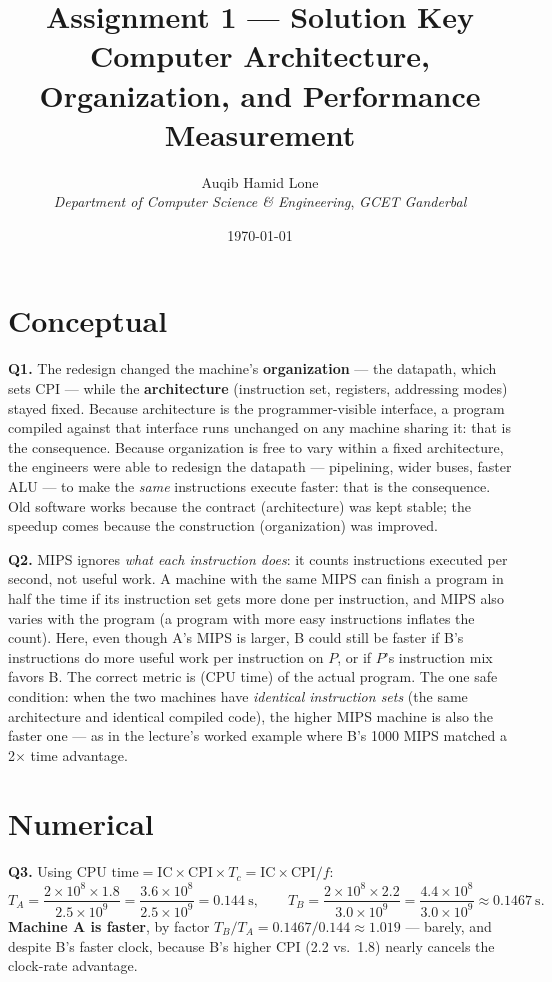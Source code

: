 \documentclass[11pt]{article}
\title{Assignment 1 --- Solution Key\\\large Computer Architecture, Organization, and Performance Measurement}
\author{Auqib Hamid Lone\\[0.3em]
  \emph{Department of Computer Science \& Engineering}, \emph{GCET Ganderbal}}
\date{\today}
\begin{document}
\maketitle

\section{Conceptual}

\textbf{Q1.} The redesign changed the machine's \textbf{organization} --- the datapath, which sets CPI --- while the \textbf{architecture} (instruction set, registers, addressing modes) stayed fixed. Because architecture is the programmer-visible interface, a program compiled against that interface runs unchanged on any machine sharing it: that is the  consequence. Because organization is free to vary within a fixed architecture, the engineers were able to redesign the datapath --- pipelining, wider buses, faster ALU --- to make the \emph{same} instructions execute faster: that is the  consequence. Old software works because the contract (architecture) was kept stable; the speedup comes because the construction (organization) was improved.

\textbf{Q2.} MIPS ignores \emph{what each instruction does}: it counts instructions executed per second, not useful work. A machine with the same MIPS can finish a program in half the time if its instruction set gets more done per instruction, and MIPS also varies with the program (a program with more easy instructions inflates the count). Here, even though A's MIPS is larger, B could still be faster if B's instructions do more useful work per instruction on $P$, or if $P$'s instruction mix favors B. The correct metric is  (CPU time) of the actual program. The one safe condition: when the two machines have \emph{identical instruction sets} (the same architecture and identical compiled code), the higher MIPS machine is also the faster one --- as in the lecture's worked example where B's 1000 MIPS matched a 2$\times$ time advantage.

\section{Numerical}

\textbf{Q3.} Using $\text{CPU time} = \text{IC} \times \text{CPI} \times T_c = \text{IC} \times \text{CPI} / f$:
\[
T_A = \frac{2\times 10^8 \times 1.8}{2.5\times 10^9} = \frac{3.6\times 10^8}{2.5\times 10^9}
    = 0.144\ \text{s}, \qquad
T_B = \frac{2\times 10^8 \times 2.2}{3.0\times 10^9} = \frac{4.4\times 10^8}{3.0\times 10^9}
    \approx 0.1467\ \text{s}.
\]
\textbf{Machine A is faster}, by factor $T_B / T_A = 0.1467 / 0.144 \approx 1.019$ --- barely, and despite B's faster clock, because B's higher CPI (2.2 vs.\ 1.8) nearly cancels the clock-rate advantage.
\end{document}
